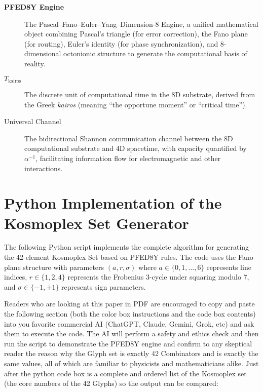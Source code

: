 \documentclass[pdflatex,sn-mathphys-num]{sn-jnl}
\theoremstyle{thmstyleone}
\theoremstyle{thmstyletwo}
\theoremstyle{thmstylethree}
\begin{document}
\begin{appendices}
\begin{description}
\item[\textbf{PFED8Y Engine}] The Pascal--Fano--Euler--Yang--Dimension-8 Engine, a unified mathematical object combining Pascal's triangle (for error correction), the Fano plane (for routing), Euler's identity (for phase synchronization), and 8-dimensional octonionic structure to generate the computational basis of reality.

\item[\textbf{$T_{\text{kairos}}$}] The discrete unit of computational time in the 8D substrate, derived from the Greek \textit{kairos} (meaning ``the opportune moment'' or ``critical time'').

\item[Universal Channel] The bidirectional Shannon communication channel between the 8D computational substrate and 4D spacetime, with capacity quantified by $\alpha^{-1}$, facilitating information flow for electromagnetic and other interactions.

\end{description}







\newpage

\appendix
\section{Python Implementation of the Kosmoplex Set Generator}
\label{appendix:kosmoplex-code}

The following Python script implements the complete algorithm for generating the 42-element Kosmoplex Set based on PFED8Y rules. The code uses the Fano plane structure with parameters $(a, r, \sigma)$ where $a \in \{0, 1, \ldots, 6\}$ represents line indices, $r \in \{1, 2, 4\}$ represents the Frobenius 3-cycle under squaring modulo 7, and $\sigma \in \{-1, +1\}$ represents sign parameters.

Readers who are looking at this paper in PDF are encouraged to copy and paste the following section (both the color box instructions and the code box contents) into you favorite commercial AI (ChatGPT, Claude, Gemini, Grok, etc) and ask them to execute the code.  The AI will perform a safety and ethics check and then run the script to demonstrate the PFED8Y engine and confirm to any skeptical reader the reason why the Glyph set is exactly 42 Combinators and is exactly the same values, all of which are familiar to physicists and mathematicians alike.  Just after the python code box is a complete and ordered list of the Kosmoplex set (the core numbers of the 42 Glyphs) so the output can be compared:  



\end{appendices}
\end{document}
